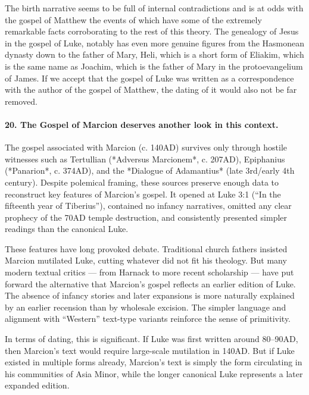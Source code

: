 The birth narrative seems to be full of internal contradictions and is at odds with the gospel of Matthew the events of which have some of the extremely remarkable facts corroborating to the rest of this theory.
The genealogy of Jesus in the gospel of Luke, notably has even more genuine figures from the Hasmonean dynasty down to the father of Mary, Heli, which is a short form of Eliakim, which is the same name as Joachim, which is the father of Mary in the protoevangelium of James.
If we accept that the gospel of Luke was written as a correspondence with the author of the gospel of Matthew, the dating of it would also not be far removed.

\paragraph{20.
The Gospel of Marcion deserves another look in this context.}\label{par:the-gospel-of-marcion-deserves-another-look-in-this-context.}

The gospel associated with Marcion (c. 140AD) survives only through hostile witnesses such as Tertullian (*Adversus Marcionem*, c. 207AD), Epiphanius (*Panarion*, c. 374AD), and the *Dialogue of Adamantius* (late 3rd/early 4th century).
Despite polemical framing, these sources preserve enough data to reconstruct key features of Marcion’s gospel.
It opened at Luke 3:1 (“In the fifteenth year of Tiberius”), contained no infancy narratives, omitted any clear prophecy of the 70AD temple destruction, and consistently presented simpler readings than the canonical Luke.

These features have long provoked debate.
Traditional church fathers insisted Marcion mutilated Luke, cutting whatever did not fit his theology.
But many modern textual critics — from Harnack to more recent scholarship — have put forward the alternative that Marcion’s gospel reflects an earlier edition of Luke.
The absence of infancy stories and later expansions is more naturally explained by an earlier recension than by wholesale excision.
The simpler language and alignment with “Western” text-type variants reinforce the sense of primitivity.

In terms of dating, this is significant.
If Luke was first written around 80–90AD, then Marcion’s text would require large-scale mutilation in 140AD.
But if Luke existed in multiple forms already, Marcion’s text is simply the form circulating in his communities of Asia Minor, while the longer canonical Luke represents a later expanded edition.

